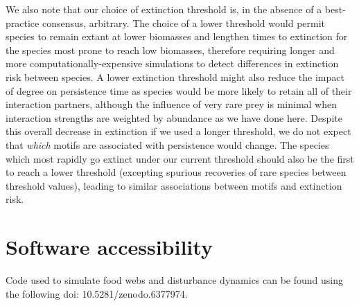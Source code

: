 \documentclass[12pt]{article}
\begin{document}
\begin{spacing}{2.0}
        
        We also note that our choice of extinction threshold is, in the absence of a best-practice consensus, arbitrary.
        The choice of a lower threshold would permit species to remain extant at lower biomasses and lengthen times to extinction for the species most prone to reach low biomasses, therefore requiring longer and more computationally-expensive simulations  to detect differences in extinction risk between species.
        A lower extinction threshold might also reduce the impact of degree on persistence time as species would be more likely to retain all of their interaction partners, although the influence of very rare prey is minimal when interaction strengths are weighted by abundance as we have done here.
        Despite this overall decrease in extinction if we used a longer threshold,  we do not expect that \emph{which} motifs are associated with persistence would change.
        The species which most rapidly go extinct under our current threshold should also be the first to reach a lower threshold (excepting spurious recoveries of rare species between threshold values), leading to similar associations between motifs and extinction risk.


\section*{Software accessibility}

    Code used to simulate food webs and disturbance dynamics can be found using the following doi: 10.5281/zenodo.6377974.





\clearpage
     

\clearpage
\end{spacing}

\clearpage

\end{document}
